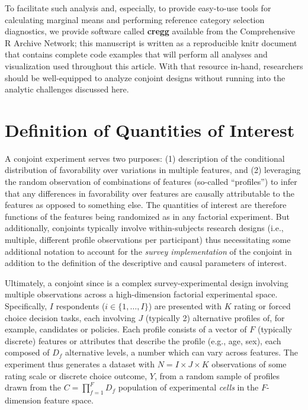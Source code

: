 \documentclass[a4paper,12pt]{article}\usepackage[]{graphicx}\usepackage[]{color}
\begin{document}
To facilitate such analysis and, especially, to provide easy-to-use tools for calculating marginal means and performing reference category selection diagnostics, we provide software called \textbf{cregg} \citep{Leeper2018cregg} available from the Comprehensive R Archive Network; this manuscript is written as a reproducible knitr document \citep{Xie2015} that contains complete code examples that will perform all analyses and visualization used throughout this article. With that resource in-hand, researchers should be well-equipped to analyze conjoint designs without running into the analytic challenges discussed here.




\singlespacing


\clearpage


\appendix
\tableofcontents



\clearpage

\section{Definition of Quantities of Interest}\label{app:quantities}

A conjoint experiment serves two purposes: (1) description of the conditional distribution of favorability over variations in multiple features, and (2) leveraging the random observation of combinations of features (so-called ``profiles'') to infer that any differences in favorability over features are causally attributable to the features as opposed to something else. The quantities of interest are therefore functions of the features being randomized as in any factorial experiment. But additionally, conjoints typically involve within-subjects research designs (i.e., multiple, different profile observations per participant) thus necessitating some additional notation to account for the \textit{survey implementation} of the conjoint in addition to the definition of the descriptive and causal parameters of interest.

Ultimately, a conjoint since \citet{HainmuellerHopkinsYamamoto2014} is a complex survey-experimental design involving multiple observations across a high-dimension factorial experimental space. Specifically, $I$ respondents ($i \in \{1, \dots, I\}$) are presented with $K$ rating or forced choice decision tasks, each involving $J$ (typically 2) alternative profiles of, for example, candidates or policies. Each profile consists of a vector of $F$ (typically discrete) features or attributes that describe the profile (e.g., age, sex), each composed of $D_f$ alternative levels, a number which can vary across features. The experiment thus generates a dataset with $N = I \times J \times K$ observations of some rating scale or discrete choice outcome, $Y$, from a random sample of profiles drawn from the $C = \prod_{f = 1}^{F} D_f$ population of experimental \textit{cells} in the $F$-dimension feature space.
\end{document}
